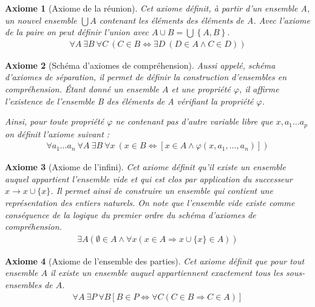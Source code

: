 \documentclass[10pt,a4paper]{article}
\newtheorem{axiom}{Axiome}[section]
\begin{document}
{\begin{axiom}[Axiome de la réunion] Cet axiome définit, à partir d'un ensemble A, un nouvel ensemble $\bigcup A$ contenant les éléments des éléments de A. Avec l'axiome de la paire on peut définir l'union avec $A \cup B = \bigcup \left\{A, B\right\}$.
\begin{align}
\forall A\ \exists B\ \forall C\ \left( C\in B \Leftrightarrow \exists D\ \left( D\in A \wedge C\in D \right) \right)
\end{align}
\end{axiom}


\begin{axiom}[Schéma d'axiomes de compréhension] Aussi appelé, schéma d'axiomes de séparation, il permet de définir la construction d'ensembles en compréhension. Étant donné un ensemble $A$ et une propriété $\varphi$, il affirme l'existence de l'ensemble B des éléments de A vérifiant la propriété $\varphi$.

Ainsi, pour toute propriété $\varphi$ ne contenant pas d'autre variable libre que $x, a_1 \ldots a_p$ on définit l'axiome suivant :
\begin{align}
\forall a_1 \ldots a_n \ \forall A \ \exists B \ \forall x \ \left( x \in B \Leftrightarrow \left[ x \in A \wedge \varphi \left(x, a_1, \ldots, a_n \right) \right] \right) 
\end{align}
\end{axiom}

\begin{axiom}[Axiome de l'infini] Cet axiome définit qu'il existe un ensemble auquel appartient l'ensemble vide et qui est clos par application du successeur$ x \rightarrow x \cup \{x\}$. Il permet ainsi de construire un ensemble qui contient une représentation des entiers naturels. On note que l'ensemble vide existe comme conséquence de la logique du premier ordre du schéma d'axiomes de compréhension.
\begin{align}
\exists A \left( \emptyset \in A \land \forall x (x \in A \Rightarrow x \cup \{x\} \in A) \right) 
\end{align}
\end{axiom}

\begin{axiom}[Axiome de l'ensemble des parties] Cet axiome définit que pour tout ensemble $A$ il existe un ensemble auquel appartiennent exactement tous les sous-ensembles de $A$.
\begin{align}
\forall A \ \exists P \ \forall B \left[B \in P \Leftrightarrow \forall C \left( C \in B \Rightarrow C \in A \right) \right] 
\end{align}
\end{axiom}

}
\end{document}

